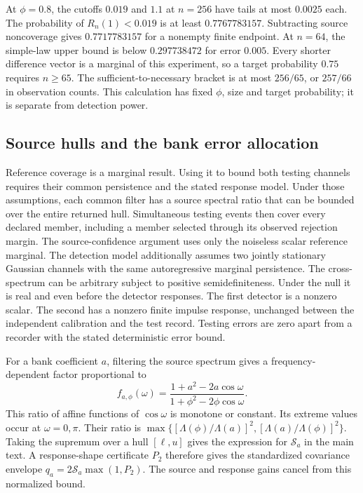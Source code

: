 At $\phi=0.8$, the cutoffs $0.019$ and $1.1$ at $n=256$ have tails at most $0.0025$ each. The probability of $R_n(1)<0.019$ is at least $0.7767783157$. Subtracting source noncoverage gives $0.7717783157$ for a nonempty finite endpoint. At $n=64$, the simple-law upper bound is below $0.297738472$ for error $0.005$. Every shorter difference vector is a marginal of this experiment, so a target probability $0.75$ requires $n\ge65$. The sufficient-to-necessary bracket is at most $256/65$, or $257/66$ in observation counts. This calculation has fixed $\phi$, size and target probability; it is separate from detection power.


\subsection{Source hulls and the bank error allocation}\label{src16:si-bank-size}
Reference coverage is a marginal result. Using it to bound both testing channels requires their common persistence and the stated response model. Under those assumptions, each common filter has a source spectral ratio that can be bounded over the entire returned hull. Simultaneous testing events then cover every declared member, including a member selected through its observed rejection margin.
The source-confidence argument uses only the noiseless scalar reference marginal. The detection model additionally assumes two jointly stationary Gaussian channels with the same autoregressive marginal persistence. The cross-spectrum can be arbitrary subject to positive semidefiniteness. Under the null it is real and even before the detector responses. The first detector is a nonzero scalar. The second has a nonzero finite impulse response, unchanged between the independent calibration and the test record. Testing errors are zero apart from a recorder with the stated deterministic error bound.

For a bank coefficient $a$, filtering the source spectrum gives a frequency-dependent factor proportional to
\[
 f_{a,\phi}(\omega)=
 \frac{1+a^2-2a\cos\omega}{1+\phi^2-2\phi\cos\omega}.
\]
This ratio of affine functions of $\cos\omega$ is monotone or constant. Its extreme values occur at $\omega=0,\pi$. Their ratio is
$\max\{[\Lambda(\phi)/\Lambda(a)]^2,[\Lambda(a)/\Lambda(\phi)]^2\}$.
Taking the supremum over a hull $[\ell,u]$ gives the expression for $\mathcal S_a$ in the main text. A response-shape certificate $P_2$ therefore gives the standardized covariance envelope $q_a=2\mathcal S_a\max(1,P_2)$. The source and response gains cancel from this normalized bound.

